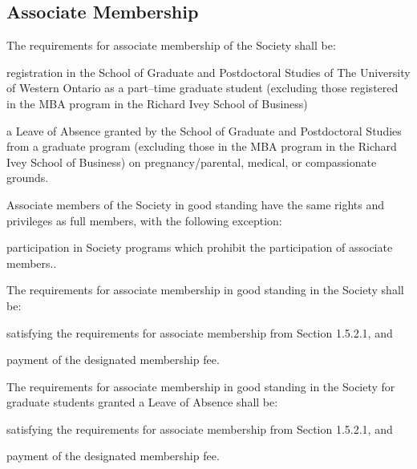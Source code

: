 \subsection{Associate Membership}
	\begin{longenum}[label*=\thesubsection.\arabic*., align=left]
  	\item  The requirements for associate membership of the Society shall be:
    	\begin{longenum}[label*=\arabic*., align=left]
    	\item registration in the School of Graduate and Postdoctoral Studies of The University of Western Ontario as a part--time graduate student (excluding those registered in the MBA program in the Richard Ivey School of Business)
    	\item a Leave of Absence granted by the School of Graduate and Postdoctoral Studies from a graduate program (excluding those in the MBA program in the Richard Ivey School of Business) on pregnancy/parental, medical, or compassionate grounds.
  	\end{longenum}
    \item Associate members of the Society in good standing have the same rights and privileges as full members, with the following exception:
    	\begin{longenum}[label*=\arabic*., align=left]
    	\item participation in Society programs which prohibit the participation of associate members..
  	\end{longenum}
    \item The requirements for associate membership in good standing in the Society shall be:
    \begin{longenum}[label*=\arabic*., align=left]
    	\item satisfying the requirements for associate membership from Section 1.5.2.1, and
        \item payment of the designated membership fee.
  	\end{longenum}
    \item  The requirements for associate membership in good standing in the Society for graduate students granted a Leave of Absence shall be:
        \begin{longenum}[label*=\arabic*., align=left]
    	\item satisfying the requirements for associate membership from Section 1.5.2.1, and
    	\item payment of the designated membership fee.

  	\end{longenum}
\end{longenum}

